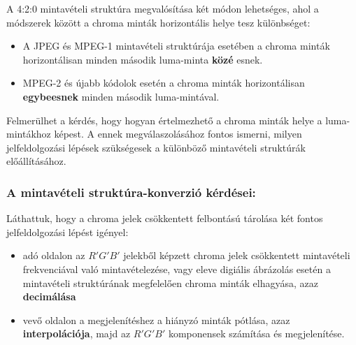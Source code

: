 \begin{itemize}
A 4:2:0 mintavételi struktúra megvalósítása két módon lehetséges, ahol a módszerek között a chroma minták horizontális helye tesz különbséget:
\begin{itemize}
\item A JPEG és MPEG-1 mintavételi struktúrája esetében a chroma minták horizontálisan minden második luma-minta \textbf{közé} esnek.
\item MPEG-2 és újabb kódolok esetén a chroma minták horizontálisan \textbf{egybeesnek} minden második luma-mintával.
\end{itemize}
\end{itemize}
Felmerülhet a kérdés, hogy hogyan értelmezhető a chroma minták helye a luma-mintákhoz képest.
A ennek megválaszolásához fontos ismerni, milyen jelfeldolgozási lépések szükségesek a különböző mintavételi struktúrák előállításához.

\subsubsection*{A mintavételi struktúra-konverzió kérdései:\\}

Láthattuk, hogy a chroma jelek csökkentett felbontású tárolása két fontos jelfeldolgozási lépést igényel:
\begin{itemize}
\item adó oldalon az $R'G'B'$ jelekből képzett chroma jelek csökkentett mintavételi frekvenciával való mintavételezése, vagy eleve digiális ábrázolás esetén a mintavételi struktúrának megfelelően chroma minták elhagyása, azaz \textbf{decimálása}
\item vevő oldalon a megjelenítéshez a hiányzó minták pótlása, azaz \textbf{interpolációja}, majd az $R'G'B'$ komponensek számítása és megjelenítése.
\end{itemize}

